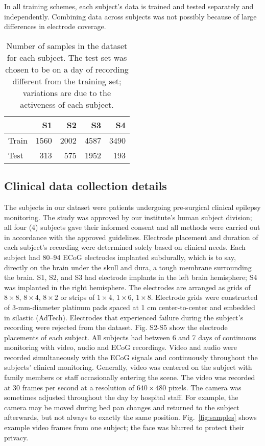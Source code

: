 \documentclass[letterpaper]{article} %
\begin{document}
In all training schemes, each subject's data is trained and tested separately and independently. Combining data across subjects was not possibly because of large differences in electrode coverage. 

\begin{table}[h]
\centering
\begin{tabular}{lrrrr}
\toprule
& S1   & S2   & S3   & S4   \\ 
\midrule
Train & 1560 & 2002 & 4587 & 3490 \\ 
Test  & 313  & 575  & 1952 & 193  \\ 
\bottomrule
\end{tabular}
\caption{Number of samples in the dataset for each subject. The test set was chosen to be on a day of recording different from the training set; variations are due to the activeness of each subject.}
\label{tab:trainingset}
\end{table}


\subsection{Clinical data collection details}

The subjects in our dataset were patients undergoing pre-surgical clinical epilepsy monitoring.
The study was approved by our institute's human subject division; all four (4) subjects gave their informed consent and all methods were carried out in accordance with the approved guidelines. 
Electrode placement and duration of each subject's recording were determined solely based on clinical needs. 
Each subject had 80--94 ECoG electrodes implanted subdurally, which is to say, directly on the brain under the skull and dura, a tough membrane surrounding the brain. 
S1, S2, and S3 had electrode implants in the left brain hemisphere; S4 was implanted in the right hemisphere. 
The electrodes are arranged as grids of $8\times8$, $8\times4$, $8\times2$ or strips of $1\times4$, $1\times6$, $1\times8$. 
Electrode grids were constructed of 3-mm-diameter platinum pads spaced at 1 cm center-to-center and embedded in silastic (AdTech). 
Electrodes that experienced failure during the subject's recording were rejected from the dataset.
Fig. S2-S5 show the electrode placements of each subject. 
All subjects had between 6 and 7 days of continuous monitoring with video, audio and ECoG recordings. 
Video and audio were recorded simultaneously with the ECoG signals and continuously throughout the subjects' clinical monitoring. 
Generally, video was centered on the subject with family members or staff occasionally entering the scene. 
The video was recorded at 30 frames per second at a resolution of $640\times480$ pixels. The camera was sometimes adjusted throughout the day by hospital staff. 
For example, the camera may be moved during bed pan changes and returned to the subject afterwards, but not always to exactly the same position. 
Fig.~\ref{fig:samples} shows example video frames from one subject; the face was blurred to protect their privacy. 
\end{document}
